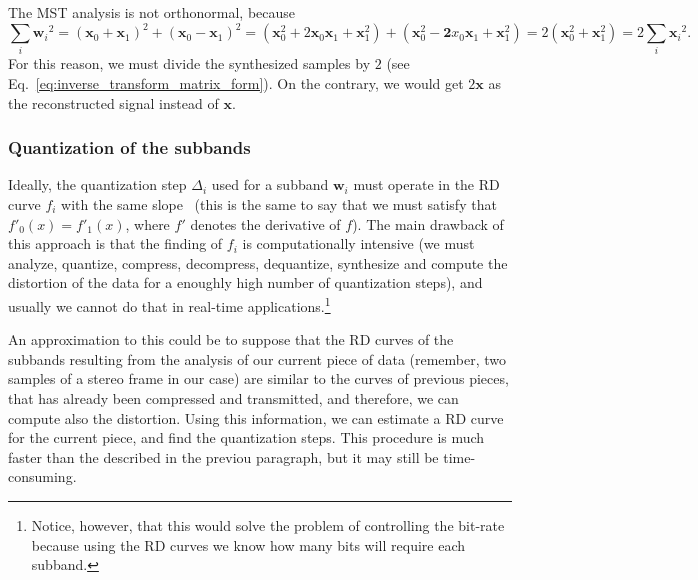 The MST analysis is not orthonormal, because
\begin{equation}
  \sum_i {{\mathbf w}_i}^2 =
  ({\mathbf x}_0 + {\mathbf x}_1)^2 + ({\mathbf x}_0 - {\mathbf x}_1)^2 =
  ({\mathbf x}_0^2 + 2{\mathbf x}_0{\mathbf x}_1+{\mathbf x}_1^2) + ({\mathbf x}_0^2-{\mathbf 2}x_0{\mathbf x}_1+{\mathbf x}_1^2) =
  2({\mathbf x}_0^2+{\mathbf x}_1^2) =
  2\sum_i {{\mathbf x}_i}^2.
  \label{eq:No_Parseval}
\end{equation}
For this reason, we must divide the synthesized samples by $2$ (see
Eq.~\ref{eq:inverse_transform_matrix_form}). On the contrary, we would
get $2{\mathbf x}$ as the reconstructed signal instead of ${\mathbf x}$.

\subsubsection{Quantization of the subbands}
Ideally, the quantization step $\Delta_i$ used for a subband ${\mathbf w}_i$
must operate in the RD curve $f_i$ with the same
slope~\cite{vetterli2014foundations,sayood2017introduction} (this is
the same to say that we must satisfy that $f'_0(x)=f'_1(x)$, where
$f'$ denotes the derivative of $f$). The main drawback of this
approach is that the finding of $f_i$ is computationally intensive (we
must analyze, quantize, compress, decompress, dequantize, synthesize
and compute the distortion of the data for a enoughly high number of
quantization steps), and usually we cannot do that in real-time
applications.\footnote{Notice, however, that this would solve the
problem of controlling the bit-rate because using the RD curves we
know how many bits will require each subband.}

An approximation to this could be to suppose that the RD curves of the
subbands resulting from the analysis of our current piece of data
(remember, two samples of a stereo frame in our case) are similar to
the curves of previous pieces, that has already been compressed and
transmitted, and therefore, we can compute also the distortion. Using
this information, we can estimate a RD curve for the current piece,
and find the quantization steps. This procedure is much faster than
the described in the previou paragraph, but it may still be
time-consuming.

